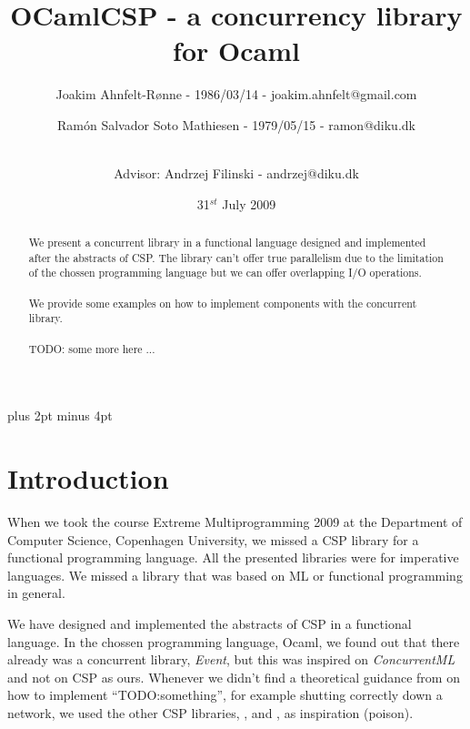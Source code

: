 \documentclass[a4paper,12pt]{article}
\title{OCamlCSP - a concurrency library for Ocaml}
\author{Joakim Ahnfelt-Rønne - 1986/03/14 - joakim.ahnfelt@gmail.com \and 
        Ramón Salvador Soto Mathiesen - 1979/05/15 - ramon@diku.dk \and
        \\ Advisor: Andrzej Filinski - andrzej@diku.dk}
\date{31$^{st}$ July 2009}
\begin{document}
\maketitle

\newpage
{}
\begin{abstract}
We present a concurrent library in a functional language designed and
implemented after the abstracts of CSP\cite{hoare}. The library can't offer true
parallelism due to the limitation of the chossen programming language but we can
offer overlapping I/O operations.
\\ \\
We provide some examples on how to implement components with the concurrent
library.
\\ \\
TODO: some more here ...
\end{abstract}

\newpage
\tableofcontents
\newpage

\parindent=0pt
\parskip=8pt plus 2pt minus 4pt

\section{Introduction}
When we took the course Extreme Multiprogramming 2009 at the Department of
Computer Science, Copenhagen University, we missed a CSP\cite{hoare} library for
a functional programming language. All the presented libraries were for
imperative languages. We missed a library that was based on ML or functional
programming in general.

We have designed and implemented the abstracts of CSP in a functional
language\cite{ocaml}. In the chossen programming language, Ocaml, we found out
that there already was a concurrent library, {\it Event}, but this was inspired
on {\it ConcurrentML} and not on CSP as ours. Whenever we didn't find a
theoretical guidance from \cite{hoare} on how to implement ``TODO:something'',
for example shutting correctly down a network, we used the other CSP libraries,
\cite{pycsp}, \cite{jcsp} and \cite{cppcsp2}, as inspiration (poison).
\end{document}
